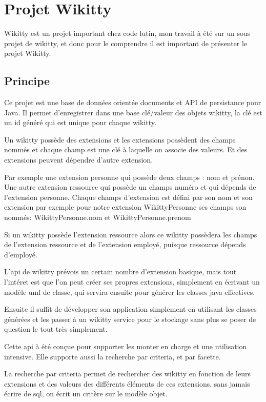 \section{Projet Wikitty}

Wikitty est un projet important chez code lutin, mon travail à été sur un sous
projet de wikitty, et donc pour le comprendre il est important de présenter
le projet Wikitty.


\subsection{Principe}

Ce projet est une base de données orientée documents et API de persistance pour
Java. Il permet d'enregistrer dans une base clé/valeur des objets wikitty, la
clé est un id généré qui est unique pour chaque wikitty. 

Un wikitty possède des extensions et les extensions possèdent des champs nommés
et chaque champ est une clé à laquelle on associe des valeurs. Et des extensions
peuvent dépendre d'autre extension.

Par exemple une extension personne qui possède deux champs : nom et prénon.
Une autre extension ressource qui possède un champs numéro et qui dépends de
l'extension personne. Chaque champs d'extension est défini par son nom et son 
extension par exemple pour notre extension WikittyPersonne ses champs son nommés:
WikittyPersonne.nom et WikittyPersonne.prenom

Si un wikitty possède l'extension ressource alors ce wikitty possèdera les
champs de l'extension ressource et de l'extension employé, puisque ressource
dépends d'employé.

L'api de wikitty prévois un certain nombre d'extension basique, mais tout
l'intéret est que l'on peut créer ses propres extensions, simplement en écrivant
un modèle uml de classe, qui servira ensuite pour générer les classes java
effectives.

Ensuite il suffit de développer son application simplement en utilisant les
classes générées et les passer à un wikitty service pour le stockage sans plus
se poser de question le tout très simplement.

Cette api à été conçue pour supporter les monter en charge et une utilisation
intensive. Elle supporte aussi la recherche par criteria, et par facette.

La recherche par criteria permet de rechercher des wikitty en fonction de leurs
extensions et des valeurs des différents éléments de ces extensions, sans jamais
écrire de sql, on écrit un critère sur le modèle objet. 

